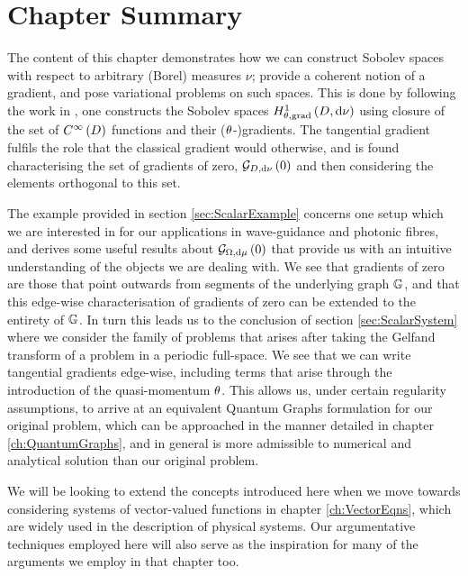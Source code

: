 \section{Chapter Summary}
The content of this chapter demonstrates how we can construct Sobolev spaces with respect to arbitrary (Borel) measures $\nu$; provide a coherent notion of a gradient, and pose variational problems on such spaces.
This is done by following the work in \cite{zhikov2000extension}, one constructs the Sobolev spaces $H^1_{\theta, \mathrm{grad}}\left( D, \mathrm{d}\nu \right)$ using closure of the set of $C^{\infty}\left( D \right)$ functions and their ($\theta$-)gradients.
The tangential gradient fulfils the role that the classical gradient would otherwise, and is found characterising the set of gradients of zero, $\mathcal{G}_{ D, \mathrm{d}\nu}\left( 0 \right)$ and then considering the elements orthogonal to this set. \newline

The example provided in section \ref{sec:ScalarExample} concerns one setup which we are interested in for our applications in wave-guidance and photonic fibres, and derives some useful results about $\mathcal{G}_{ \Omega, \mathrm{d}\mu}\left( 0 \right)$ that provide us with an intuitive understanding of the objects we are dealing with.
We see that gradients of zero are those that point outwards from segments of the underlying graph $\mathbb{G}$, and that this edge-wise characterisation of gradients of zero can be extended to the entirety of $\mathbb{G}$.
In turn this leads us to the conclusion of section \ref{sec:ScalarSystem} where we consider the family of problems that arises after taking the Gelfand transform of a problem in a periodic full-space. 
We see that we can write tangential gradients edge-wise, including terms that arise through the introduction of the quasi-momentum $\theta$.
This allows us, under certain regularity assumptions, to arrive at an equivalent Quantum Graphs formulation for our original problem, which can be approached in the manner detailed in chapter \ref{ch:QuantumGraphs}, and in general is more admissible to numerical and analytical solution than our original problem. \newline

We will be looking to extend the concepts introduced here when we move towards considering systems of vector-valued functions in chapter \ref{ch:VectorEqns}, which are widely used in the description of physical systems.
Our argumentative techniques employed here will also serve as the inspiration for many of the arguments we employ in that chapter too.
